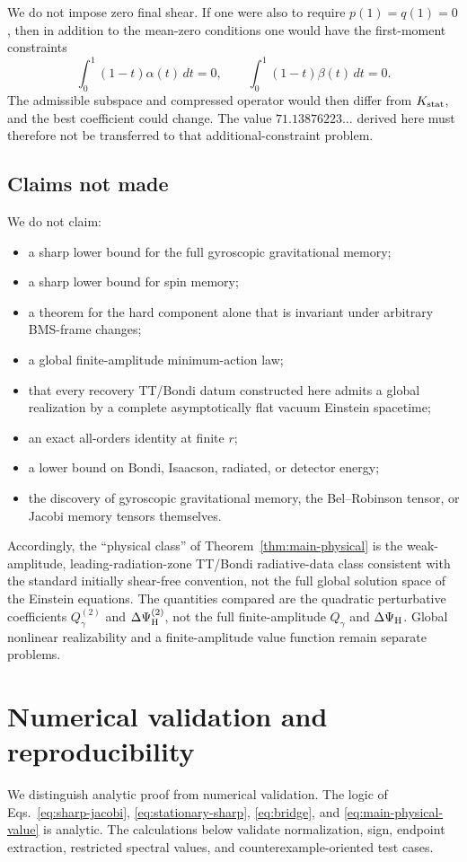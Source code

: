 We do not impose zero final shear. If one were also to require $p(1)=q(1)=0$, then in addition to the mean-zero conditions one would have the first-moment constraints
\[
\int_0^1(1-t)\alpha(t)\,dt=0,\qquad
\int_0^1(1-t)\beta(t)\,dt=0.
\]
The admissible subspace and compressed operator would then differ from $K_{\rm stat}$, and the best coefficient could change. The value $71.13876223\ldots$ derived here must therefore not be transferred to that additional-constraint problem.

\subsection{Claims not made}
We do not claim:
\begin{itemize}
\item a sharp lower bound for the full gyroscopic gravitational memory;
\item a sharp lower bound for spin memory;
\item a theorem for the hard component alone that is invariant under arbitrary BMS-frame changes;
\item a global finite-amplitude minimum-action law;
\item that every recovery TT/Bondi datum constructed here admits a global realization by a complete asymptotically flat vacuum Einstein spacetime;
\item an exact all-orders identity at finite $r$;
\item a lower bound on Bondi, Isaacson, radiated, or detector energy;
\item the discovery of gyroscopic gravitational memory, the Bel--Robinson tensor, or Jacobi memory tensors themselves.
\end{itemize}

Accordingly, the ``physical class'' of Theorem~\ref{thm:main-physical} is the weak-amplitude, leading-radiation-zone TT/Bondi radiative-data class consistent with the standard initially shear-free convention, not the full global solution space of the Einstein equations. The quantities compared are the quadratic perturbative coefficients $Q_\gamma^{(2)}$ and $\Delta\Psi_{\rm H}^{(2)}$, not the full finite-amplitude $Q_\gamma$ and $\Delta\Psi_{\rm H}$. Global nonlinear realizability and a finite-amplitude value function remain separate problems.

\section{Numerical validation and reproducibility}
We distinguish analytic proof from numerical validation. The logic of Eqs.~\eqref{eq:sharp-jacobi}, \eqref{eq:stationary-sharp}, \eqref{eq:bridge}, and \eqref{eq:main-physical-value} is analytic. The calculations below validate normalization, sign, endpoint extraction, restricted spectral values, and counterexample-oriented test cases.


